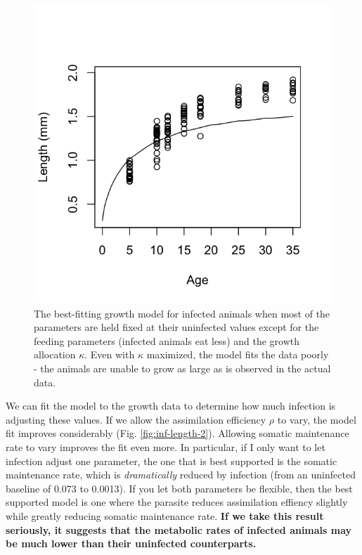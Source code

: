 \documentclass[12pt,reqno,final,pdftex]{amsart}\usepackage[]{graphicx}\usepackage[]{color}
\newenvironment{knitrout}{}{} %
\theoremstyle{plain}
\numberwithin{equation}{part}
\begin{document}
\begin{knitrout}\scriptsize
{}\color{fgcolor}\begin{figure}

\includegraphics[width=\linewidth]{figure/inf-length-1} \hfill{}

\caption[The best-fitting growth model for infected animals when most of the parameters are held fixed at their uninfected values except for the feeding parameters (infected animals eat less) and the growth allocation $\kappa$]{The best-fitting growth model for infected animals when most of the parameters are held fixed at their uninfected values except for the feeding parameters (infected animals eat less) and the growth allocation $\kappa$. Even with $\kappa$ maximized, the model fits the data poorly - the animals are unable to grow as large as is observed in the actual data.}\label{fig:inf-length}
\end{figure}


\end{knitrout}

We can fit the model to the growth data to determine how much infection is adjusting these values.
If we allow the assimilation efficiency $\rho$ to vary, the model fit improves considerably (Fig. \ref{fig:inf-length-2}).
Allowing somatic maintenance rate to vary improves the fit even more.
In particular, if I only want to let infection adjust one parameter, the one that is best supported is the somatic maintenance rate, which is \emph{dramatically} reduced by infection (from an uninfected baseline of 0.073 to 0.0013).
If you let both parameters be flexible, then the best supported model is one where the parasite reduces assimilation effiency slightly while greatly reducing somatic maintenance rate.
\textbf{If we take this result seriously, it suggests that the metabolic rates of infected animals may be much lower than their uninfected counterparts.}
\end{document}
